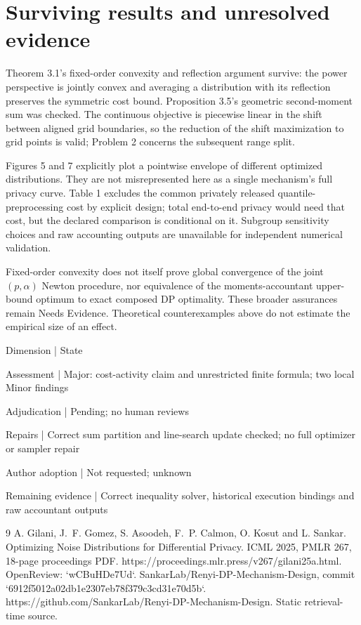 \documentclass[10pt]{article}
\begin{document}
\section*{Surviving results and unresolved evidence}
Theorem 3.1’s fixed-order convexity and reflection argument survive: the power perspective is jointly convex and averaging a distribution with its reflection preserves the symmetric cost bound. Proposition 3.5’s geometric second-moment sum was checked. The continuous objective is piecewise linear in the shift between aligned grid boundaries, so the reduction of the shift maximization to grid points is valid; Problem 2 concerns the subsequent range split.\par
Figures 5 and 7 explicitly plot a pointwise envelope of different optimized distributions. They are not misrepresented here as a single mechanism’s full privacy curve. Table 1 excludes the common privately released quantile-preprocessing cost by explicit design; total end-to-end privacy would need that cost, but the declared comparison is conditional on it. Subgroup sensitivity choices and raw accounting outputs are unavailable for independent numerical validation.\par
Fixed-order convexity does not itself prove global convergence of the joint \((p,\alpha)\) Newton procedure, nor equivalence of the moments-accountant upper-bound optimum to exact composed DP optimality. These broader assurances remain Needs Evidence. Theoretical counterexamples above do not estimate the empirical size of an effect.\par
Dimension | State\par
Assessment | Major: cost-activity claim and unrestricted finite formula; two local Minor findings\par
Adjudication | Pending; no human reviews\par
Repairs | Correct sum partition and line-search update checked; no full optimizer or sampler repair\par
Author adoption | Not requested; unknown\par
Remaining evidence | Correct inequality solver, historical execution bindings and raw accountant outputs\par
9 A. Gilani, J. F. Gomez, S. Asoodeh, F. P. Calmon, O. Kosut and L. Sankar. Optimizing Noise Distributions for Differential Privacy. ICML 2025, PMLR 267, 18-page proceedings PDF. https://proceedings.mlr.press/v267/gilani25a.html. OpenReview: `wCBuHDe7Ud`. SankarLab/Renyi-DP-Mechanism-Design, commit `6912f5012a02db1e2307eb78f379c3cd31e70d5b`. https://github.com/SankarLab/Renyi-DP-Mechanism-Design. Static retrieval-time source.\par
\end{document}
